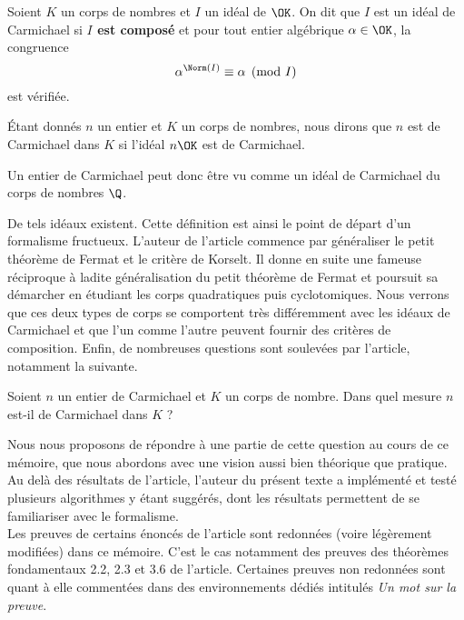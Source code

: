 \begin{definition} Soient $K$ un corps de nombres et $I$ un idéal de $\OK$. On dit que $I$ est un idéal de Carmichael si \textbf{$I$ est composé} et pour tout entier algébrique $\alpha \in \OK$, la congruence
	\begin{equation}\label{congruence-Carmichael}
		\alpha^{\Norm(I)} \equiv \alpha \pmod{I}
	\end{equation}
est vérifiée.
\end{definition}

Étant donnés $n$ un entier et $K$ un corps de nombres, nous dirons que $n$ est de Carmichael dans $K$ si l'idéal $n\OK$ est de Carmichael.

\begin{remarque}
	Un entier de Carmichael peut donc être vu comme un idéal de Carmichael du corps de nombres $\Q$.
\end{remarque}

De tels idéaux existent. Cette définition est ainsi le point de départ d'un formalisme fructueux. L'auteur de l'article commence par généraliser le petit théorème de Fermat et le critère de Korselt. Il donne en suite une fameuse réciproque à ladite généralisation du petit théorème de Fermat et poursuit sa démarcher en étudiant les corps quadratiques puis cyclotomiques. Nous verrons que ces deux types de corps se comportent très différemment avec les idéaux de Carmichael et que l'un comme l'autre peuvent fournir des critères de composition. Enfin, de nombreuses questions sont soulevées par l'article, notamment la suivante. \\

\begin{question}\label{question-centrale}Soient $n$ un entier de Carmichael et $K$ un corps de nombre. Dans quel mesure $n$ est-il de Carmichael dans $K$ ?
\end{question}

Nous nous proposons de répondre à une partie de cette question au cours de ce mémoire, que nous abordons avec une vision aussi bien théorique que pratique. Au delà des résultats de l'article, l'auteur du présent texte a implémenté et testé plusieurs algorithmes y étant suggérés, dont les résultats permettent de se familiariser avec le formalisme. \\

Les preuves de certains énoncés de l'article sont redonnées (voire légèrement modifiées) dans ce mémoire. C'est le cas notamment des preuves des théorèmes fondamentaux 2.2, 2.3 et 3.6 de l'article. Certaines preuves non redonnées sont quant à elle commentées dans des environnements dédiés intitulés \textit{Un mot sur la preuve}.

